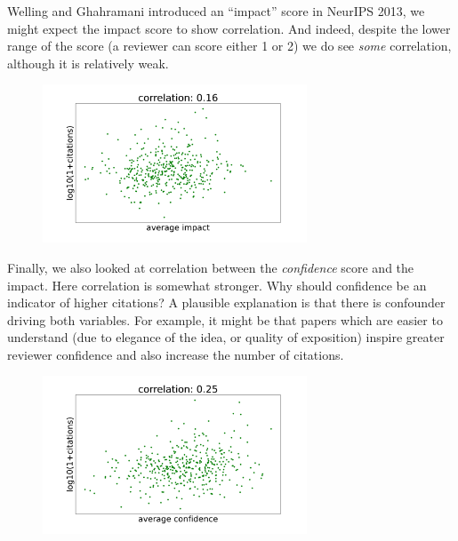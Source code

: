 Welling and Ghahramani introduced an ``impact'' score in NeurIPS 2013,
we might expect the impact score to show correlation. And indeed,
despite the lower range of the score (a reviewer can score either 1 or
2) we do see \emph{some} correlation, although it is relatively weak.

\begin{figure}[htb]
\includegraphics[width=0.70\textwidth]{diagrams/neurips/citations-vs-average-impact-accept.pdf}


\caption{}
\label{citations-vs-average-impact-accept}
\end{figure}

Finally, we also looked at correlation between the \emph{confidence}
score and the impact. Here correlation is somewhat stronger. Why should
confidence be an indicator of higher citations? A plausible explanation
is that there is confounder driving both variables. For example, it
might be that papers which are easier to understand (due to elegance of
the idea, or quality of exposition) inspire greater reviewer confidence
and also increase the number of citations.

\begin{figure}[htb]
\includegraphics[width=0.70\textwidth]{diagrams/neurips/citations-vs-average-confidence-accept.pdf}


\caption{}
\label{citations-vs-average-confidence-accept}
\end{figure}

